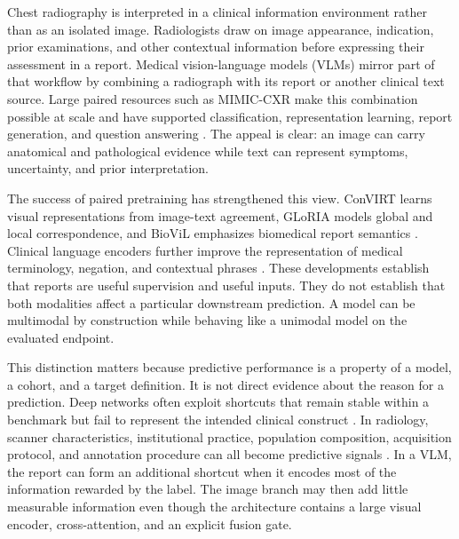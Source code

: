 \documentclass[10pt,a4paper,twocolumn]{article}
\begin{document}
Chest radiography is interpreted in a clinical information environment rather
than as an isolated image. Radiologists draw on image appearance, indication,
prior examinations, and other contextual information before expressing their
assessment in a report. Medical vision-language models (VLMs) mirror part of
that workflow by combining a radiograph with its report or another clinical
text source. Large paired resources such as MIMIC-CXR make this combination
possible at scale and have supported classification, representation learning,
report generation, and question answering \cite{johnson2019mimiccxr}. The
appeal is clear: an image can carry anatomical and pathological evidence while
text can represent symptoms, uncertainty, and prior interpretation.

The success of paired pretraining has strengthened this view. ConVIRT learns
visual representations from image-text agreement, GLoRIA models global and
local correspondence, and BioViL emphasizes biomedical report semantics
\cite{zhang2022convirt,huang2021gloria,boecking2022textsemantics}. Clinical
language encoders further improve the representation of medical terminology,
negation, and contextual phrases \cite{devlin2019bert,alsentzer2019clinicalbert}.
These developments establish that reports are useful supervision and useful
inputs. They do not establish that both modalities affect a particular
downstream prediction. A model can be multimodal by construction while behaving
like a unimodal model on the evaluated endpoint.

This distinction matters because predictive performance is a property of a
model, a cohort, and a target definition. It is not direct evidence about the
reason for a prediction. Deep networks often exploit shortcuts that remain
stable within a benchmark but fail to represent the intended clinical
construct \cite{geirhos2020shortcut}. In radiology, scanner characteristics,
institutional practice, population composition, acquisition protocol, and
annotation procedure can all become predictive signals
\cite{gichoya2023shortcuts}. In a VLM, the report can form an additional shortcut
when it encodes most of the information rewarded by the label. The image branch
may then add little measurable information even though the architecture
contains a large visual encoder, cross-attention, and an explicit fusion gate.
\end{document}
